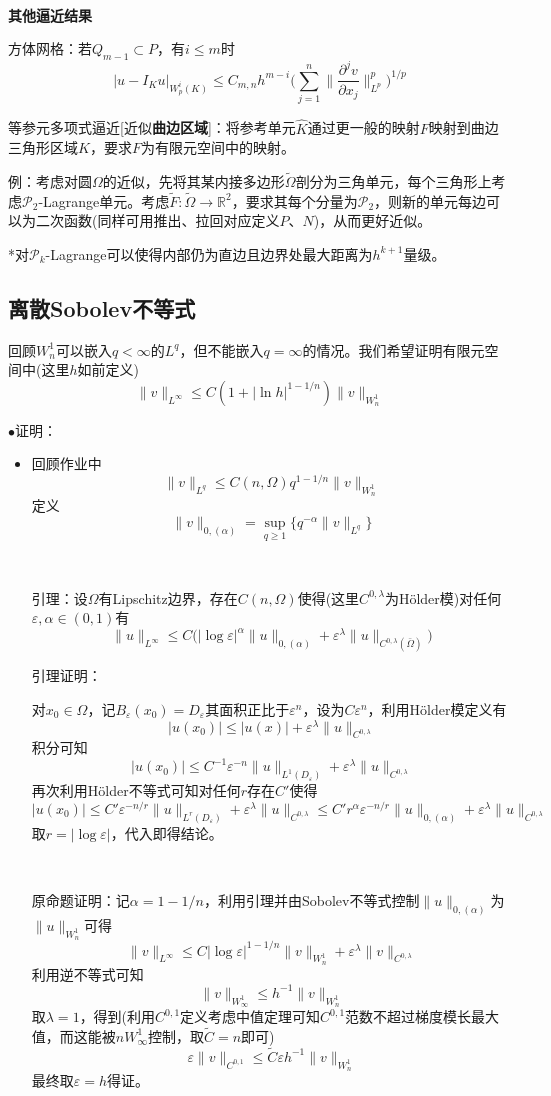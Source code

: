 \documentclass[a4paper,UTF8,fontset=windows]{ctexart}
\newcommand*{\cp}{\mathcal{P}}
\newcommand{\proo}[1]{{\kaishu $\bullet$证明：
\begin{itemize}
    \item[] #1
\end{itemize}
}}
\begin{document}
\

\textbf{其他逼近结果}

方体网格：若$Q_{m-1}\subset P$，有$i\le m$时
$$|u-I_Ku|_{W_p^i(K)}\le C_{m,n}h^{m-i}\bigg(\sum_{j=1}^n\bigg\|\frac{\partial^jv}{\partial x_j}\bigg\|_{L^p}^p\bigg)^{1/p}$$

等参元多项式逼近[近似\textbf{曲边区域}]：将参考单元$\hat{K}$通过更一般的映射$F$映射到曲边三角形区域$K$，要求$F$为有限元空间中的映射。

例：考虑对圆$\Omega$的近似，先将其某内接多边形$\tilde{\Omega}$剖分为三角单元，每个三角形上考虑$\cp_2$-Lagrange单元。考虑$\tilde{F}:\tilde{\Omega}\to\mathbb{R}^2$，要求其每个分量为$\cp_2$，则新的单元每边可以为二次函数(同样可用推出、拉回对应定义$P$、$N$)，从而更好近似。

*对$\cp_k$-Lagrange可以使得内部仍为直边且边界处最大距离为$h^{k+1}$量级。

\subsection{离散Sobolev不等式}
回顾$W_n^1$可以嵌入$q<\infty$的$L^q$，但不能嵌入$q=\infty$的情况。我们希望证明有限元空间中(这里$h$如前定义)
$$\|v\|_{L^\infty}\le C(1+|\ln h|^{1-1/n})\|v\|_{W_n^1}$$

\proo{
    回顾作业中
    $$\|v\|_{L^q}\le C(n,\Omega)q^{1-1/n}\|v\|_{W_n^1}$$
    定义
    $$\|v\|_{0,(\alpha)}=\sup_{q\ge1}\{q^{-\alpha}\|v\|_{L^q}\}$$

    \

    引理：设$\Omega$有Lipschitz边界，存在$C(n,\Omega)$使得(这里$C^{0,\lambda}$为H\"older模)对任何$\varepsilon,\alpha\in(0,1)$有
    $$\|u\|_{L^\infty}\le C\bigg(|\log\varepsilon|^\alpha\|u\|_{0,(\alpha)}+\varepsilon^\lambda\|u\|_{C^{0,\lambda}(\bar{\Omega})}\bigg)$$

    引理证明：

    对$x_0\in\Omega$，记$B_\varepsilon(x_0)=D_\varepsilon$其面积正比于$\varepsilon^n$，设为$C\varepsilon^n$，利用H\"older模定义有
    $$|u(x_0)|\le|u(x)|+\varepsilon^\lambda\|u\|_{C^{0,\lambda}}$$
    积分可知
    $$|u(x_0)|\le C^{-1}\varepsilon^{-n}\|u\|_{L^1(D_\varepsilon)}+\varepsilon^\lambda\|u\|_{C^{0,\lambda}}$$
    再次利用H\"older不等式可知对任何$r$存在$C'$使得
    $$|u(x_0)|\le C'\varepsilon^{-n/r}\|u\|_{L^r(D_\varepsilon)}+\varepsilon^\lambda\|u\|_{C^{0,\lambda}}\le C'r^\alpha\varepsilon^{-n/r}\|u\|_{0,(\alpha)}+\varepsilon^\lambda\|u\|_{C^{0,\lambda}}$$
    取$r=|\log\varepsilon|$，代入即得结论。

    \

    原命题证明：记$\alpha=1-1/n$，利用引理并由Sobolev不等式控制$\|u\|_{0,(\alpha)}$为$\|u\|_{W_n^1}$可得
    $$\|v\|_{L^\infty}\le C|\log\varepsilon|^{1-1/n}\|v\|_{W_n^1}+\varepsilon^\lambda\|v\|_{C^{0,\lambda}}$$
    利用逆不等式可知
    $$\|v\|_{W_\infty^1}\le h^{-1}\|v\|_{W_n^1}$$
    取$\lambda=1$，得到(利用$C^{0,1}$定义考虑中值定理可知$C^{0,1}$范数不超过梯度模长最大值，而这能被$nW_\infty^1$控制，取$\tilde{C}=n$即可)
    $$\varepsilon\|v\|_{C^{0,1}}\le\tilde{C}\varepsilon h^{-1}\|v\|_{W_n^1}$$
    最终取$\varepsilon=h$得证。
}
\end{document}
